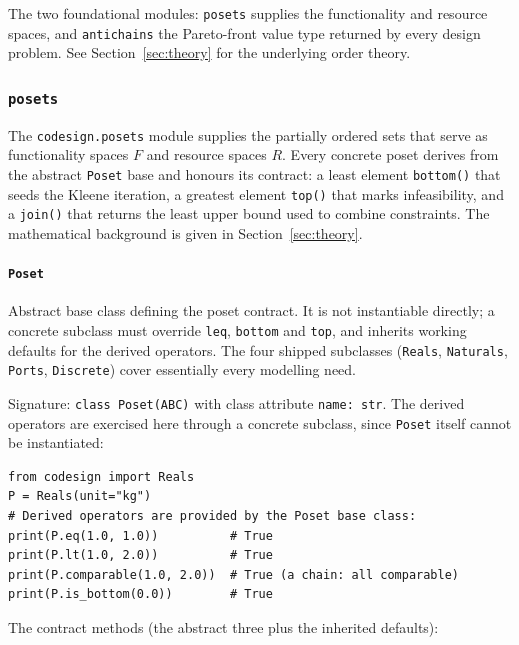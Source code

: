 \documentclass[11pt,a4paper]{article}
\begin{document}
The two foundational modules: \texttt{posets} supplies the functionality
and resource spaces, and \texttt{antichains} the Pareto-front value type
returned by every design problem. See Section~\ref{sec:theory} for the
underlying order theory.

\subsubsection{\texttt{posets}}
\label{ref:posets}

The \texttt{codesign.posets} module supplies the partially ordered sets
that serve as functionality spaces $F$ and resource spaces $R$. Every
concrete poset derives from the abstract \texttt{Poset} base and honours
its contract: a least element \texttt{bottom()} that seeds the Kleene
iteration, a greatest element \texttt{top()} that marks infeasibility,
and a \texttt{join()} that returns the least upper bound used to combine
constraints. The mathematical background is given in
Section~\ref{sec:theory}.

\paragraph{\texttt{Poset}}
\label{ref:posets:poset}
Abstract base class defining the poset contract. It is not instantiable
directly; a concrete subclass must override \texttt{leq}, \texttt{bottom}
and \texttt{top}, and inherits working defaults for the derived
operators. The four shipped subclasses (\texttt{Reals}, \texttt{Naturals},
\texttt{Ports}, \texttt{Discrete}) cover essentially every modelling need.

Signature: \texttt{class Poset(ABC)} with class attribute
\texttt{name: str}. The derived operators are exercised here through a
concrete subclass, since \texttt{Poset} itself cannot be instantiated:

\begin{lstlisting}
from codesign import Reals
P = Reals(unit="kg")
# Derived operators are provided by the Poset base class:
print(P.eq(1.0, 1.0))          # True
print(P.lt(1.0, 2.0))          # True
print(P.comparable(1.0, 2.0))  # True (a chain: all comparable)
print(P.is_bottom(0.0))        # True
\end{lstlisting}

The contract methods (the abstract three plus the inherited defaults):
\end{document}

